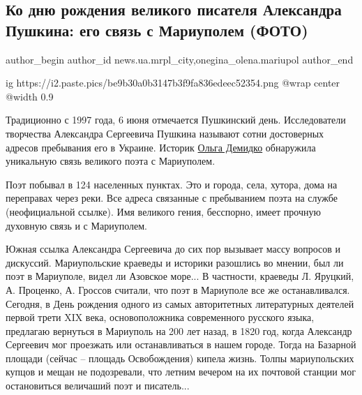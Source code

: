  
 
 
 
 
 
\subsection{Ко дню рождения великого писателя Александра Пушкина: его связь с Мариуполем (ФОТО)}
\label{sec:06_06_2020.stz.news.ua.mrpl_city.1.pushkin_mariupol_svjaz_demidko}
 
\ifcmt
 author_begin
   author_id news.ua.mrpl_city,onegina_olena.mariupol
 author_end
\fi

\ifcmt
  ig https://i2.paste.pics/be9b30a0b3147b3f9fa836edeec52354.png
  @wrap center
  @width 0.9
\fi

Традиционно с 1997 года, 6 июня отмечается Пушкинский день. Исследователи
творчества Александра Сергеевича Пушкина называют сотни достоверных адресов
пребывания его в Украине. Историк \href{\urlDemidkoIA}{Ольга Демидко} обнаружила уникальную связь
великого поэта с Мариуполем.

Поэт побывал в 124 населенных пунктах. Это и города, села, хутора, дома на
переправах через реки. Все адреса связанные с пребыванием поэта на службе
(неофициальной ссылке). Имя великого гения, бесспорно, имеет прочную духовную
связь и с Мариуполем.

Южная ссылка Александра Сергеевича до сих пор вызывает массу вопросов и
дискуссий. Мариупольские краеведы и историки разошлись во мнении, был ли поэт в
Мариуполе, видел ли Азовское море... В частности, краеведы Л. Яруцкий, А.
Проценко, А. Гроссов считали, что поэт в Мариуполе все же останавливался.
Сегодня, в День рождения одного из самых авторитетных литературных деятелей
первой трети XIX века, основоположника современного русского языка, предлагаю
вернуться в Мариуполь на 200 лет назад, в 1820 год, когда Александр Сергеевич
мог проезжать или останавливаться в нашем городе. Тогда на Базарной  площади
(сейчас – площадь Освобождения) кипела жизнь. Толпы мариупольских купцов и
мещан не подозревали, что летним вечером на их почтовой станции мог
остановиться величаший поэт и писатель... 

